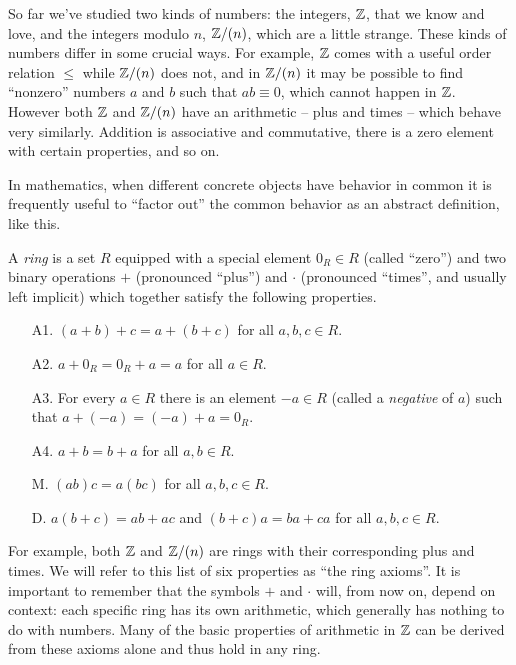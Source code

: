 So far we've studied two kinds of numbers: the integers, \(\mathbb{Z}\), that we know and love, and the integers modulo \(n\), \(\mathbb{Z}/(n)\), which are a little strange.
These kinds of numbers differ in some crucial ways.
For example, \(\mathbb{Z}\) comes with a useful order relation \(\leq\) while \(\mathbb{Z}/(n)\) does not, and in \(\mathbb{Z}/(n)\) it may be possible to find ``nonzero'' numbers \(a\) and \(b\) such that \(ab \equiv 0\), which cannot happen in \(\mathbb{Z}\).
However both \(\mathbb{Z}\) and \(\mathbb{Z}/(n)\) have an arithmetic -- plus and times -- which behave very similarly.
Addition is associative and commutative, there is a zero element with certain properties, and so on.

In mathematics, when different concrete objects have behavior in common it is frequently useful to ``factor out'' the common behavior as an abstract definition, like this.

\begin{dfn}[Ring] \label{dfn:ring}
A \emph{ring} is a set \(R\) equipped with a special element \(0_R \in R\) (called ``zero'') and two binary operations \(+\) (pronounced ``plus'') and \(\cdot\) (pronounced ``times'', and usually left implicit) which together satisfy the following properties.
\begin{itemize}
\item[A1.] \((a+b)+c = a+(b+c)\) for all \(a,b,c \in R\).
\item[A2.] \(a+0_R = 0_R+a = a\) for all \(a \in R\).
\item[A3.] For every \(a \in R\) there is an element \(-a \in R\) (called a \emph{negative} of \(a\)) such that \(a+(-a) = (-a)+a = 0_R\).
\item[A4.] \(a + b = b + a\) for all \(a,b \in R\).
\item[M.] \((ab)c = a(bc)\) for all \(a,b,c \in R\).
\item[D.] \(a(b+c) = ab + ac\) and \((b+c)a = ba + ca\) for all \(a,b,c \in R\).
\end{itemize}
\end{dfn}

For example, both \(\mathbb{Z}\) and \(\mathbb{Z}/(n)\) are rings with their corresponding plus and times.
We will refer to this list of six properties as ``the ring axioms''.
It is important to remember that the symbols \(+\) and \(\cdot\) will, from now on, depend on context: each specific ring has its own arithmetic, which generally has nothing to do with numbers.
Many of the basic properties of arithmetic in \(\mathbb{Z}\) can be derived from these axioms alone and thus hold in any ring.

